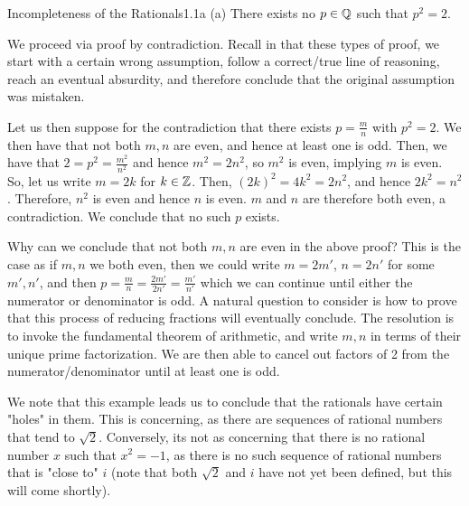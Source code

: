 \begin{example}{Incompleteness of the Rationals}{1.1a}
    (a) There exists no $p \in \mathbb{Q}$ such that $p^2 = 2$.
\end{example}
We proceed via proof by contradiction. Recall in that these types of proof, we start with a certain wrong assumption, follow a correct/true line of reasoning, reach an eventual absurdity, and therefore conclude that the original assumption was mistaken. 
\begin{nproof}
    Let us then suppose for the contradiction that there exists $p = \frac{m}{n}$ with $p^2 = 2$. We then have that not both $m, n$ are even, and hence at least one is odd. Then, we have that $2 = p^2 = \frac{m^2}{n^2}$ and hence $m^2 = 2n^2$, so $m^2$ is even, implying $m$ is even. So, let us write $m = 2k$ for $k \in \mathbb{Z}$. Then, $(2k)^2 = 4k^2 = 2n^2$, and hence $2k^2 = n^2$. Therefore, $n^2$ is even and hence $n$ is even. $m$ and $n$ are therefore both even, a contradiction. We conclude that no such $p$ exists.
\end{nproof}
Why can we conclude that not both $m, n$ are even in the above proof? This is the case as if $m, n$ we both even, then we could write $m = 2m'$, $n = 2n'$ for some $m', n'$, and then $p = \frac{m}{n} = \frac{2m'}{2n'} = \frac{m'}{n'}$ which we can continue until either the numerator or denominator is odd. A natural question to consider is how to prove that this process of reducing fractions will eventually conclude. The resolution is to invoke the fundamental theorem of arithmetic, and write $m, n$ in terms of their unique prime factorization. We are then able to cancel out factors of 2 from the numerator/denominator until at least one is odd.

We note that this example leads us to conclude that the rationals have certain "holes" in them. This is concerning, as there are sequences of rational numbers that tend to $\sqrt{2}$. Conversely, its not as concerning that there is no rational number $x$ such that $x^2 = -1$, as there is no such sequence of rational numbers that is "close to" $i$ (note that both $\sqrt{2}$ and $i$ have not yet been defined, but this will come shortly).

\setcounter{rudin}{0}

